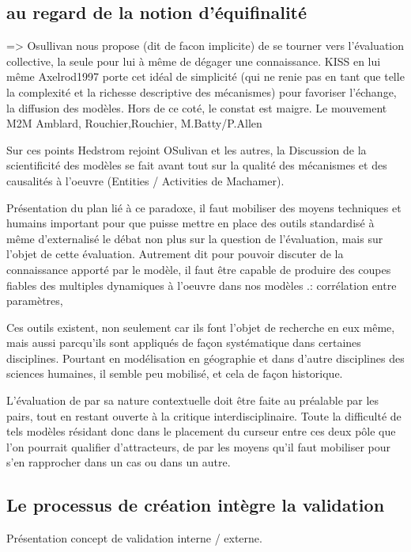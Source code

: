 \subsection{au regard de la notion d'équifinalité}

=> Osullivan nous propose (dit de facon implicite) de se tourner  vers l'évaluation collective, la seule pour lui à même de dégager une connaissance. KISS en lui même {Axelrod1997} porte cet idéal de simplicité (qui ne renie pas en tant que telle la complexité et la richesse descriptive des mécanismes) pour favoriser l'échange, la diffusion des modèles. Hors de ce coté, le constat est maigre. Le mouvement M2M {Amblard, Rouchier},{Rouchier}, {M.Batty/P.Allen}

Sur ces points Hedstrom rejoint OSulivan et les autres, la Discussion de la scientificité des modèles se fait avant tout sur la qualité des mécanismes et des causalités à l'oeuvre (Entities / Activities de Machamer).  

Présentation du plan lié à ce paradoxe, il faut mobiliser des moyens techniques et humains important pour que puisse mettre  en place des outils standardisé à même d'externalisé le débat non plus sur la question de l'évaluation, mais sur l'objet de cette évaluation. Autrement dit pour pouvoir discuter de la connaissance apporté par le modèle, il faut être capable de produire des coupes fiables des multiples dynamiques à l'oeuvre dans nos modèles .: corrélation entre paramètres, 

Ces outils existent, non seulement car ils font l'objet de recherche en eux même, mais aussi parcqu'ils sont appliqués de façon systématique dans certaines disciplines. Pourtant en modélisation en géographie et dans d'autre disciplines des sciences humaines, il semble peu mobilisé, et cela de façon historique.

L'évaluation de par sa nature contextuelle doit être faite au préalable par les pairs, tout en restant ouverte à la critique interdisciplinaire. Toute la difficulté de tels modèles résidant donc dans le placement du curseur entre ces deux pôle que l'on pourrait qualifier d'attracteurs, de par les moyens qu'il faut mobiliser pour s'en rapprocher dans un cas ou dans un autre.

\subsection{Le processus de création intègre la validation}

Présentation concept de validation interne / externe.

